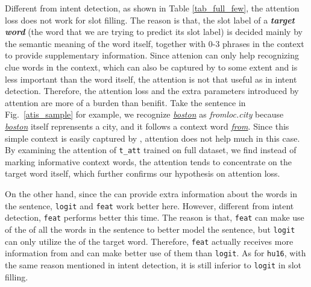 Different from intent detection, as shown in Table \ref{tab_full_few}, the attention loss does not work for slot filling.
The reason is that, the slot label of a \textbf{\emph{target word}} (the word that we are trying to predict its slot label) is decided mainly by the semantic meaning of the word itself, together with 0-3 phrases in the context to provide supplementary information.
Since attenion can only help recognizing clue words in the context, which can also be captured by \BLSTM to some extent and is less important than the word itself, the attention is not that useful as in intent detection.
Therefore, the attention loss and the extra parameters introduced by attention are more of a burden than benifit.
Take the sentence in Fig.~\ref{atis_sample} for example, we recognize \textsl{\underline{boston}} as \emph{fromloc.city} because \textsl{\underline{boston}} itself reprensents a city, and it follows a context word \textsl{\underline{from}}. Since this simple context is easily
captured by \BLSTM, attention does not help much in this case.
By examining the attention of \texttt{t\_att} trained on full dataset,
we find instead of marking informative context words, the attention tends to concentrate on the target word itself, which
further confirms our hypothesis on attention loss.

On the other hand, since the \REtags can provide extra information about the words in the sentence, \texttt{logit} and \texttt{feat} work better here.
However, different from intent detection, \texttt{feat} performs better this time.
The reason is that, \texttt{feat} can make use of the \REtags of all the words in the sentence to better model the sentence, but \texttt{logit} can only utilize the \REtag of the target word.
Therefore, \texttt{feat} actually receives more information from \RE and can make better use of them than \texttt{logit}.
As for \texttt{hu16}, with the same reason mentioned in intent detection, it is still inferior to \texttt{logit} in slot filling.

